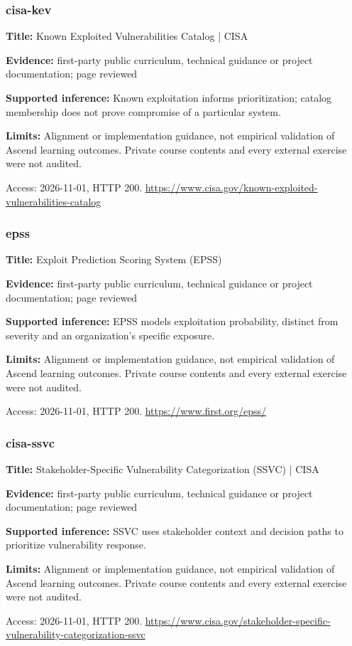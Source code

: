 \subsubsection{cisa-kev}
\noindent\textbf{Title:} Known Exploited Vulnerabilities Catalog | CISA\par
\noindent\textbf{Evidence:} first-party public curriculum, technical guidance or project documentation; page reviewed\par
\noindent\textbf{Supported inference:} Known exploitation informs prioritization; catalog membership does not prove compromise of a particular system.\par
\noindent\textbf{Limits:} Alignment or implementation guidance, not empirical validation of Ascend learning outcomes. Private course contents and every external exercise were not audited.\par
\noindent Access: 2026-11-01, HTTP 200. \url{https://www.cisa.gov/known-exploited-vulnerabilities-catalog}
\subsubsection{epss}
\noindent\textbf{Title:} Exploit Prediction Scoring System (EPSS)\par
\noindent\textbf{Evidence:} first-party public curriculum, technical guidance or project documentation; page reviewed\par
\noindent\textbf{Supported inference:} EPSS models exploitation probability, distinct from severity and an organization's specific exposure.\par
\noindent\textbf{Limits:} Alignment or implementation guidance, not empirical validation of Ascend learning outcomes. Private course contents and every external exercise were not audited.\par
\noindent Access: 2026-11-01, HTTP 200. \url{https://www.first.org/epss/}
\subsubsection{cisa-ssvc}
\noindent\textbf{Title:} Stakeholder-Specific Vulnerability Categorization (SSVC) | CISA\par
\noindent\textbf{Evidence:} first-party public curriculum, technical guidance or project documentation; page reviewed\par
\noindent\textbf{Supported inference:} SSVC uses stakeholder context and decision paths to prioritize vulnerability response.\par
\noindent\textbf{Limits:} Alignment or implementation guidance, not empirical validation of Ascend learning outcomes. Private course contents and every external exercise were not audited.\par
\noindent Access: 2026-11-01, HTTP 200. \url{https://www.cisa.gov/stakeholder-specific-vulnerability-categorization-ssvc}
